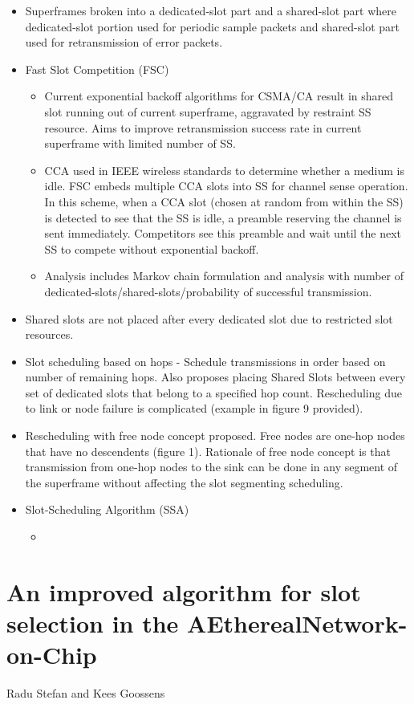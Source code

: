 \documentclass{article}
\begin{document}
\begin{itemize}
    \item Superframes broken into a dedicated-slot part and a shared-slot part where dedicated-slot portion used for periodic sample packets and shared-slot part used for retransmission of error packets.
    \item Fast Slot Competition (FSC)
    \begin{itemize}
        \item Current exponential backoff algorithms for CSMA/CA result in shared slot running out of current superframe, aggravated by restraint SS resource.  Aims to improve retransmission success rate in current superframe with limited number of SS.
        \item CCA used in IEEE wireless standards to determine whether a medium is idle. FSC embeds multiple CCA slots into SS for channel sense operation.  In this scheme, when a CCA slot (chosen at random from within the SS) is detected to see that the SS is idle, a preamble reserving the channel is sent immediately.  Competitors see this preamble and wait until the next SS to compete without exponential backoff.
        \item Analysis includes Markov chain formulation and analysis with number of dedicated-slots/shared-slots/probability of successful transmission.
    \end{itemize}
    \item Shared slots are not placed after every dedicated slot due to restricted slot resources.
    \item Slot scheduling based on hops - Schedule transmissions in order based on number of remaining hops.  Also proposes placing Shared Slots between every set of dedicated slots that belong to a specified hop count.  Rescheduling due to link or node failure is complicated (example in figure 9 provided).
    \item Rescheduling with free node concept proposed.  Free nodes are one-hop nodes that have no descendents (figure 1). Rationale of free node concept is that transmission from one-hop nodes to the sink can be done in any segment of the superframe without affecting the slot segmenting scheduling.
    \item Slot-Scheduling Algorithm (SSA)
    \begin{itemize}
        \item
    \end{itemize}
\end{itemize}

\section{An improved algorithm for slot selection in the AEtherealNetwork-on-Chip}
Radu Stefan and Kees Goossens
\end{document}
